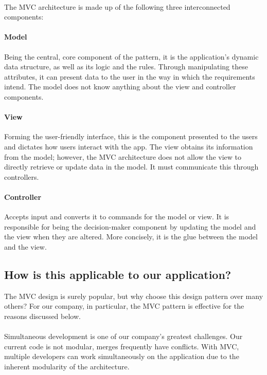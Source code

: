 \documentclass{turabian-researchpaper}
\begin{document}
\paragraph{}
The MVC architecture is made up of the following three interconnected components:\cite{mdnwebdocs}
\par
\paragraph{Model}
Being the central, core component of the pattern,\cite{wikipedia_2020} it is the application's dynamic data structure, as well as its logic and the rules. Through manipulating these attributes, it can present data to the user in the way in which the requirements intend.\cite{UnitTesting} The model does not know anything about the view and controller components. \cite{microsoft}
\par
\paragraph{View}
Forming the user-friendly interface, this is the component presented to the users and dictates how users interact with the app. The view obtains its information from the model; however, the MVC architecture does not allow the view to directly retrieve or update data in the model. \cite{wikipedia_2020}\cite{mdnwebdocs} It must communicate this through controllers.
\paragraph{Controller}
Accepts input and converts it to commands for the model or view. It is responsible for being the decision-maker component by updating the model and the view when they are altered.\cite{wikipedia_2020} More concisely, it is the glue between the model and the view.\cite{chrome}
\par
\subsection{How is this applicable to our application?}
The MVC design is surely popular, but why choose this design pattern over many others? For our company, in particular, the MVC pattern is effective for the reasons discussed below.
\paragraph{}
Simultaneous development is one of our company’s greatest challenges. Our current code is not modular, merges frequently have conflicts. With MVC, multiple developers can work simultaneously on the application due to the inherent modularity of the architecture.\cite{UnitTesting}  
\par
\end{document}
